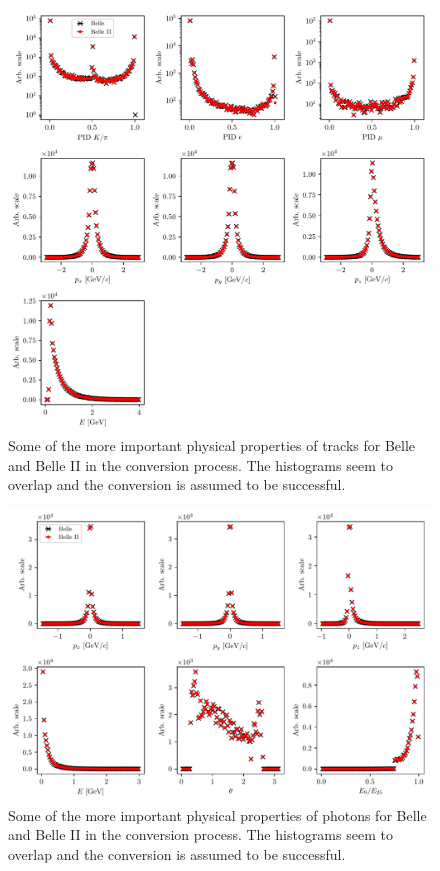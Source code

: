 \begin{figure}[H]
	\centering
	\captionsetup{width=0.8\linewidth}
	\includegraphics[width=\linewidth]{fig/b2bii_tracks}
	\caption{Some of the more important physical properties of tracks for Belle and Belle II in the conversion process. The histograms seem to overlap and the conversion is assumed to be successful.}
	\label{fig:b2bii_tracks}
\end{figure}

\begin{figure}[H]
	\centering
	\captionsetup{width=0.8\linewidth}
	\includegraphics[width=\linewidth]{fig/b2bii_gammas}
	\caption{Some of the more important physical properties of photons for Belle and Belle II in the conversion process. The histograms seem to overlap and the conversion is assumed to be successful.}
	\label{fig:b2bii_gammas}
\end{figure}

